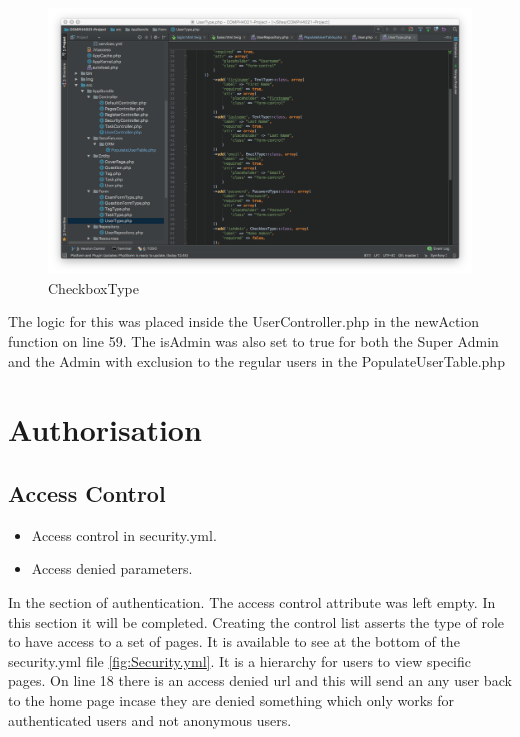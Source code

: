 \begin{figure}[htbp]
   \centering
   \includegraphics[width=400pt]{figures/checkbox_type.png} %
   \caption{CheckboxType}
   \label{fig:CheckboxType}
\end{figure}

The logic for this was placed inside the UserController.php in the newAction function on line 59. The isAdmin was also set to true for both the Super Admin and the Admin with exclusion to the regular users in the PopulateUserTable.php 

\section{Authorisation}

\subsection{Access Control}

\begin{itemize}
  \item Access control in security.yml.
    \item Access denied parameters.
\end{itemize}

In the section of authentication. The access control attribute was left empty. In this section it will be completed. Creating the control list asserts the type of role to have access to a set of pages. It is available to see at the bottom of the security.yml file \ref{fig:Security.yml}. It is a hierarchy for users to view specific pages. On line 18 there is an access denied url and this will send an any user back to the home page incase they are denied something which only works for authenticated users and not anonymous users.

